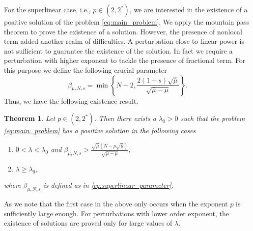 \documentclass[11pt]{article}
\newtheorem{theorem}{Theorem}[section] %
\newcommand{\la} {\lambda}
\begin{document}
For the superlinear case, i.e., $p \in (2,2^*)$, we are interested in the existence of a positive solution of the problem \eqref{eq:main_problem}. We apply the mountain pass theorem to prove the existence of a solution. However, the presence of nonlocal term added another realm of difficulties. A perturbation close to linear power is not sufficient to guarantee the existence of the solution. In fact we require a perturbation with higher exponent to tackle the presence of fractional term. For this purpose we define the following crucial parameter
\begin{equation}\label{eq:superlinear_parameter}
    \beta_{\mu,N,s} = \min \left\{ N-2, \frac{2(1-s)\sqrt{\bar\mu}}{\sqrt{\bar\mu - \mu}} \right\}.
\end{equation}
Thus, we have the following existence result.
\begin{theorem}\label{thm:superlinear_pb}
Let $p \in (2,2^*)$. Then there exists a $\la_0 >0$ such that the problem \eqref{eq:main_problem} has a positive solution in the following cases
\begin{enumerate}
    \item $ 0 < \la < \la_0$ and $\beta_{\mu,N,s} > \frac{\sqrt{\bar\mu}(N - p \sqrt{\bar\mu})}{\sqrt{\bar\mu - \mu}}$,
    \item $\la \geq \la_0$,
\end{enumerate}
where $\beta_{\mu,N,s}$ is defined as in \eqref{eq:superlinear_parameter}.
\end{theorem}
As we note that the first case in the above only occurs when the exponent $p$ is sufficiently large enough. For perturbations with lower order exponent, the existence of solutions are proved only for large values of $\la$.\\
\end{document}
